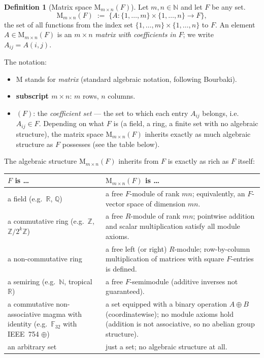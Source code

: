 \documentclass[11pt]{amsart}
\theoremstyle{plain}
\theoremstyle{definition}
\newtheorem{definition}[theorem]{Definition}
\begin{document}
\begin{definition}[Matrix space $\mathrm{M}_{m \times n}(F)$]
\label{def:matrix-space}
Let $m, n \in \mathbb{N}$ and let $F$ be any set.
\[
    \mathrm{M}_{m \times n}(F)
    \;:=\;
    \{ A : \{1,\ldots,m\} \times \{1,\ldots,n\} \to F \},
\]
the set of all functions from the index set $\{1,\ldots,m\} \times \{1,\ldots,n\}$ to $F$.
An element $A \in \mathrm{M}_{m \times n}(F)$ is an \emph{$m \times n$ matrix with
coefficients in $F$}; we write $A_{ij} = A(i,j)$.

\medskip
\noindent The notation:
\begin{itemize}
    \item \textbf{$\mathrm{M}$} stands for \emph{matrix} (standard algebraic notation,
    following Bourbaki).
    \item \textbf{subscript $m \times n$}: $m$ rows, $n$ columns.
    \item \textbf{$(F)$}: the \emph{coefficient set} — the set to which each
    entry $A_{ij}$ belongs, i.e.\ $A_{ij} \in F$.  Depending on what $F$ is
    (a field, a ring, a finite set with no algebraic structure), the matrix
    space $\mathrm{M}_{m \times n}(F)$ inherits exactly as much algebraic
    structure as $F$ possesses (see the table below).
\end{itemize}

\medskip
\noindent The algebraic structure $\mathrm{M}_{m \times n}(F)$ inherits from $F$
is exactly as rich as $F$ itself:
\begin{center}
\renewcommand{\arraystretch}{1.3}
\begin{tabular}{p{5.5cm}p{7cm}}
\hline
\textbf{$F$ is \ldots} & \textbf{$\mathrm{M}_{m \times n}(F)$ is \ldots} \\
\hline
a field (e.g.\ $\mathbb{R}$, $\mathbb{Q}$) &
    a free $F$-module of rank $mn$; equivalently, an $F$-vector space of
    dimension $mn$. \\
a commutative ring (e.g.\ $\mathbb{Z}$, $\mathbb{Z}/2^k\mathbb{Z}$) &
    a free $R$-module of rank $mn$; pointwise addition and scalar
    multiplication satisfy all module axioms. \\
a non-commutative ring &
    a free left (or right) $R$-module; row-by-column multiplication of
    matrices with square $F$-entries is defined. \\
a semiring (e.g.\ $\mathbb{N}$, tropical $\mathbb{R}$) &
    a free $F$-semimodule (additive inverses not guaranteed). \\
a commutative non-associative magma with identity
(e.g.\ $\mathbb{F}_{32}$ with IEEE~754 $\oplus$) &
    a set equipped with a binary operation $A \oplus B$
    (coordinatewise); no module axioms hold (addition is not
    associative, so no abelian group structure). \\
an arbitrary set &
    just a set; no algebraic structure at all. \\
\hline
\end{tabular}
\end{center}


\end{definition}
\end{document}
